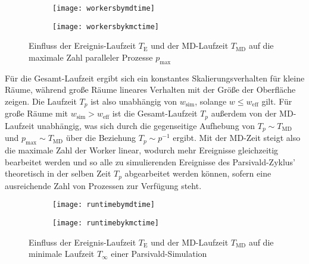 \begin{figure}[p]

  \captionsetup[subfigure]{singlelinecheck=false}
  \def\subfigwidth{7cm}
  \begin{subfigure}[t]{\subfigwidth}
    \texttt{[image: workersbymdtime]}
  \end{subfigure}
  \hfill
  \begin{subfigure}[t]{\subfigwidth}
    \texttt{[image: workersbykmctime]}
  \end{subfigure}

  \caption[$p_\text{max}$ in Abhängigkeit von $T_\text{E}$ und $T_\text{MD}$]{Einfluss der Ereignis-Laufzeit $T_\text{E}$ und der MD-Laufzeit $T_\text{MD}$ auf die maximale Zahl paralleler Prozesse $p_\text{max}$}
  \label{fig:workersbytime}

\end{figure}

Für die Gesamt-Laufzeit ergibt sich ein konstantes Skalierungsverhalten für kleine Räume, während große Räume lineares Verhalten mit der Größe der Oberfläche zeigen.
Die Laufzeit $T_p$ ist also unabhängig von $w_\text{sim}$, solange $w \le w_\text{eff}$ gilt.
Für große Räume mit $w_\text{sim} > w_\text{eff}$ ist die Gesamt-Laufzeit $T_p$ außerdem von der MD-Laufzeit unabhängig, was sich durch die gegenseitige Aufhebung von $T_p \sim T_\text{MD}$ und $p_\text{max} \sim T_\text{MD}$ über die Beziehung $T_p \sim p^{-1}$ ergibt.
Mit der MD-Zeit steigt also die maximale Zahl der Worker linear, wodurch mehr Ereignisse gleichzeitig bearbeitet werden und so alle zu simulierenden Ereignisse des Parsivald-Zyklus' theoretisch in der selben Zeit $T_p$ abgearbeitet werden können, sofern eine ausreichende Zahl von Prozessen zur Verfügung steht.

\begin{figure}[p]

  \captionsetup[subfigure]{singlelinecheck=false}
  \def\subfigwidth{7cm}
  \begin{subfigure}[t]{\subfigwidth}
    \texttt{[image: runtimebymdtime]}
  \end{subfigure}
  \hfill
  \begin{subfigure}[t]{\subfigwidth}
    \texttt{[image: runtimebykmctime]}
  \end{subfigure}

  \caption[$T_\infty$ in Abhängigkeit von $T_\text{E}$ und $T_\text{MD}$]{Einfluss der Ereignis-Laufzeit $T_\text{E}$ und der MD-Laufzeit $T_\text{MD}$ auf die minimale Laufzeit $T_\infty$ einer Parsivald-Simulation}
  \label{fig:runtimebytime}

\end{figure}

